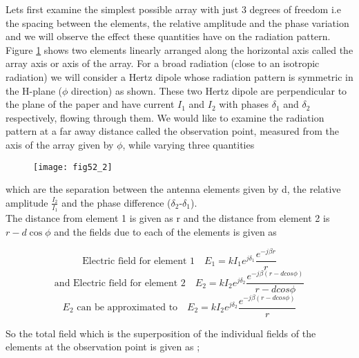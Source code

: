 Lets first examine the simplest possible array with just 3 degrees of freedom i.e the spacing between the elements, the relative amplitude and the phase variation and we will observe the effect these quantities have on the radiation pattern. Figure \ref{52.2} shows two elements linearly arranged along the horizontal axis called the array axis or axis of the array. For a broad radiation (close to an isotropic radiation) we will consider a Hertz dipole whose radiation pattern is symmetric in the H-plane ($\phi$ direction) as shown. These two Hertz dipole are perpendicular to the plane of the paper and have current $I_1$ and $I_2$ with phases $\delta_1$ and $\delta_2$ respectively, flowing through them. We would like to examine the radiation pattern at a far away distance called the observation point, measured from the axis of the array given by $\phi$, while varying three quantities
\begin{figure}[h!]
	\texttt{[image: fig52\_2]}
	\centering
	\caption{}
	\label{52.2}
	
\end{figure}
which are the separation between the antenna elements given by d, the relative amplitude $\frac{I_2}{I_1}$ and the phase difference ($\delta_2$-$\delta_1$). \\The distance from element 1 is given as r and the distance from element 2 is $r-d\cos\phi$ and the fields due to each of the elements is given as 


$$
\text{Electric field for element 1} \quad E_1 = k I_{1} e^{j\delta_1}  \dfrac{e^{-j\beta r}}{r}  
$$ 
$$
\text{and Electric field for element 2} \quad E_2 =k I_{2} e^{j\delta_2} \dfrac{e^{-j\beta(r-dcos\phi)}}{r-dcos\phi}%
$$
$$
\text{$E_2$ can be approximated to} \quad E_2 = k I_{2}
e^{j\delta_2} \dfrac{e^{-j\beta(r-dcos\phi)}}{r}  %
$$

So the total field which is the superposition of the individual fields of the elements at the observation point is given as ;

